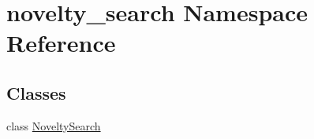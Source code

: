 \hypertarget{namespacenovelty__search}{}\section{novelty\+\_\+search Namespace Reference}
\label{namespacenovelty__search}
\subsection*{Classes}
\begin{DoxyCompactItemize}
\item 
class \hyperlink{classnovelty__search_1_1_novelty_search}{Novelty\+Search}
\end{DoxyCompactItemize}
